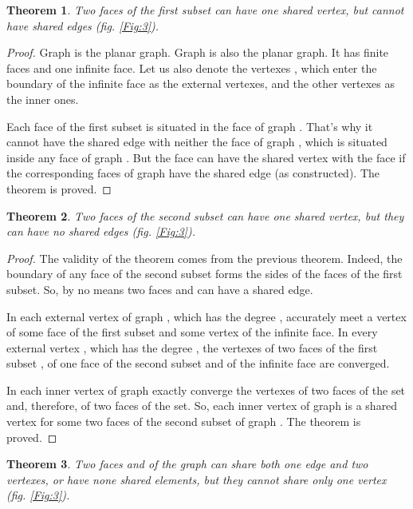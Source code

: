\documentclass{amsart}
\newtheorem{theorem}{Theorem}
\theoremstyle{plain}
\numberwithin{equation}{section}
\begin{document}
\begin{theorem}
Two faces of the first subset  can have one shared vertex, but cannot have shared edges (fig. \ref{Fig:3}).
\end {theorem}

\begin {proof}
Graph  is the planar graph. Graph  is also the planar graph. It has  finite faces and one infinite face. Let us also denote the vertexes , which enter the boundary of the infinite face as the external vertexes, and the other vertexes   as the inner ones.

Each face  of the first subset is situated in the face  of graph . That's why it cannot have the shared edge with neither the face  of graph , which is situated inside any face  of graph . But the face  can have the shared vertex with the face  if the corresponding faces of graph  have the shared edge (as constructed). The theorem is proved.
\end {proof}

\begin{theorem}
Two faces of the second subset  can have one shared vertex, but they can have no shared edges (fig. \ref{Fig:3}).
\end {theorem}

\begin {proof}
The validity of the theorem comes from the previous theorem. Indeed, the boundary of any face  of the second subset forms the sides of the faces  of the first subset. So, by no means two faces  and  can have a shared edge.

In each external vertex  of graph , which has the degree , accurately meet a vertex of some face  of the first subset and some vertex of the infinite face. In every external vertex , which has the degree , the vertexes of two faces of the first subset , of one face of the second subset  and of the infinite face  are converged.

In each inner vertex  of graph  exactly converge the vertexes of two faces of the  set and, therefore, of two faces of the  set. So, each inner vertex of graph  is a shared vertex for some two faces of the second subset  of graph . The theorem is proved.
\end {proof}

\begin{theorem}
Two faces  and  of the graph  can share both one edge and two vertexes, or have none shared elements, but they cannot share only one vertex (fig. \ref{Fig:3}).
\end {theorem}
\end{document}
